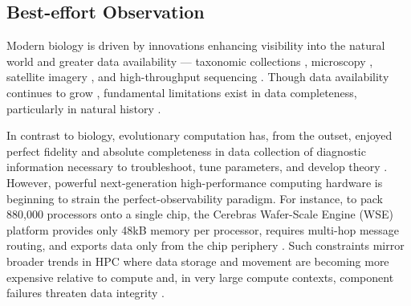 \subsection{Best-effort Observation}
\label{sec:best-effort}

Modern biology is driven by innovations enhancing visibility into the natural world and greater data availability \citep{strasser2012data} --- taxonomic collections \citep{winsor2009taxonomy}, microscopy \citep{turner1890cell}, satellite imagery \citep{stark2016toward}, and high-throughput sequencing \citep{durack2018gut}.
Though data availability continues to grow \citep{sulston1983embryonic,sheth2017multiplex,weeks2022deep}, fundamental limitations exist in data completeness, particularly in natural history \citep{benton2011assessing,delsuc2005phylogenomics}.

In contrast to biology, evolutionary computation has, from the outset, enjoyed perfect fidelity and absolute completeness in data collection of diagnostic information necessary to troubleshoot, tune parameters, and develop theory \citep{hernandez2023suite,hooker1995testing,oneil2003digital,lenski2003evolutionary}.
However, powerful next-generation high-performance computing hardware \citep{zhang2016cambricon,emani2021accelerating,jia2019dissecting,medina2020habana,lauterbach2021path,vanessendelft2025record} is beginning to strain the perfect-observability paradigm.
For instance, to pack 880,000 processors onto a single chip, the Cerebras Wafer-Scale Engine (WSE) platform provides only 48kB memory per processor, requires multi-hop message routing, and exports data only from the chip periphery \citep{miyajima2025benchmarking,he2025wafer,vanessendelft2025system}.
Such constraints mirror broader trends in HPC where data storage and movement are becoming more expensive relative to compute \citep{buluc2021randomized,khan2021analysis,gholami2024ai,klasky2021data} and, in very large compute contexts, component failures threaten data integrity \citep{snir2014addressing,kokolis2025revisiting}.

